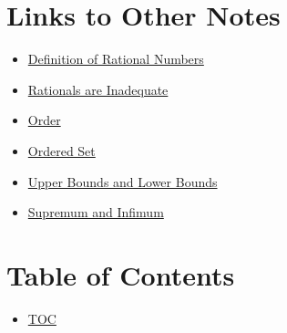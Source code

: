 \section*{Links to Other Notes}
\begin{itemize}
  \item \hyperref[202501131947]{Definition of Rational Numbers}
  \item \hyperref[202501132004]{Rationals are Inadequate}
  \item \hyperref[202501141228]{Order}
  \item \hyperref[202501141241]{Ordered Set}
  \item \hyperref[202501141250]{Upper Bounds and Lower Bounds}
  \item \hyperref[202501141546]{Supremum and Infimum}
\end{itemize}

\section*{Table of Contents}

\begin{itemize}
  \item \hyperref[toc]{TOC}
\end{itemize}

